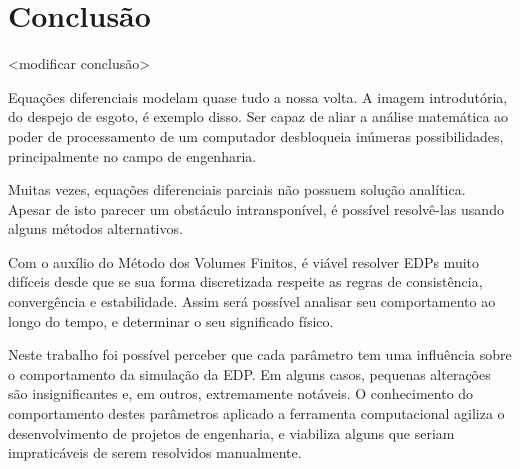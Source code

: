 \chapter{Conclusão}
<modificar conclusão>

Equações diferenciais modelam quase tudo a nossa volta. A imagem introdutória,
do despejo de esgoto, é exemplo disso. Ser capaz de aliar a análise matemática
ao poder de processamento de um computador desbloqueia inúmeras possibilidades,
principalmente no campo de engenharia.

Muitas vezes, equações diferenciais parciais não possuem solução analítica.
Apesar de isto parecer um obstáculo intransponível, é possível resolvê-las
usando alguns métodos alternativos.

Com o auxílio do Método dos Volumes Finitos, é viável resolver EDPs muito
difíceis desde que se sua forma discretizada respeite as regras de
consistência, convergência e estabilidade. Assim será possível analisar seu
comportamento ao longo do tempo, e determinar o seu significado físico.

Neste trabalho foi possível perceber que cada parâmetro tem uma influência
sobre o comportamento da simulação da EDP. Em alguns casos, pequenas alterações
são insignificantes e, em outros, extremamente notáveis. O conhecimento do
comportamento destes parâmetros aplicado a ferramenta computacional agiliza o
desenvolvimento de projetos de engenharia, e viabiliza alguns que seriam
impraticáveis de serem resolvidos manualmente.